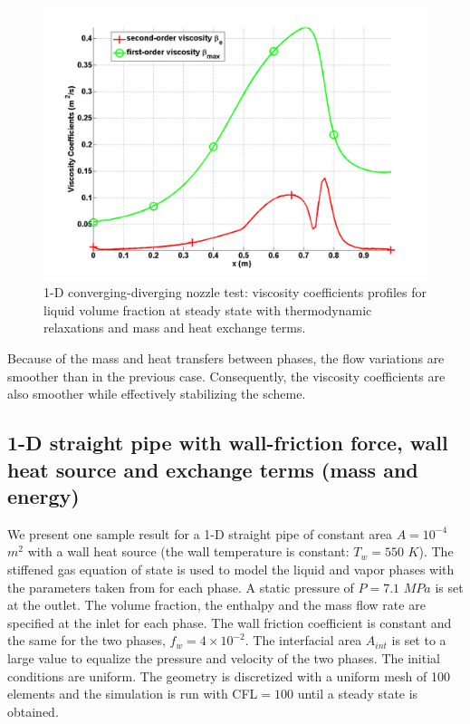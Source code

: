 %
\begin{figure}[H]
\centering
\includegraphics[width=\textwidth]{figures/SEM/Aint1e3MassOn_liquid_beta.png}
\caption{1-D converging-diverging nozzle test: viscosity coefficients profiles for liquid volume fraction at steady state with thermodynamic relaxations and mass and heat exchange terms.}
\label{fig:two-fluids-rel-nozzle-visc-vf-mass-on-sem-sect4}
\end{figure}
%
Because of the mass and heat transfers between phases, the flow variations are smoother than in the previous case. Consequently, the viscosity coefficients are also smoother while effectively stabilizing the scheme.  
\subsection{1-D straight pipe with wall-friction force, wall heat source and exchange terms (mass and energy)}\label{sec:1d-straight-pipe-7-eq-sct4}
We present one sample result for a 1-D straight pipe of constant area $A = 10^{-4}$ $m^2$ with a wall heat source (the wall temperature is constant: $T_w = 550$ $K$). The stiffened gas equation of state is used to model the liquid and vapor phases with the parameters taken from \cite{SGEOS} for each phase. A static pressure of $P=7.1$ $MPa$ is set at the outlet. The volume fraction, the enthalpy and the mass flow rate are specified at the inlet for each phase. The wall friction coefficient is constant and the same for the two phases, $f_w = 4 \times 10^{-2}$. The interfacial area $A_{int}$ is set to a large value to equalize the pressure and velocity of the two phases. The initial conditions are uniform. The geometry is discretized with a uniform mesh of 100 elements and the simulation is run with CFL$=100$  until a steady state is obtained. 

